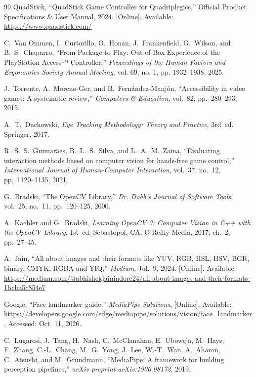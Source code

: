 \documentclass[twoside, a4paper, 11pt]{article}
\begin{document}
\begin{thebibliography}{99}
QuadStick, ``QuadStick Game Controller for Quadriplegics,'' Official Product Specifications \& User Manual, 2024. [Online]. Available: \url{https://www.quadstick.com/}

C.~Van Ommen, I.~Curtorillo, O.~Honan, J.~Frankenfield, G.~Wilson, and B.~S.~Chaparro, ``From Package to Play: Out-of-Box Experience of the PlayStation Access™ Controller,'' \emph{Proceedings of the Human Factors and Ergonomics Society Annual Meeting}, vol. 69, no. 1, pp. 1932--1938, 2025.

J.~Torrente, A.~Moreno-Ger, and B.~Fern\'andez-Manj\'on, ``Accessibility in video games: A systematic review,'' \emph{Computers \& Education}, vol.~82, pp.~280--293, 2015.

A.~T.~Duchowski, \emph{Eye Tracking Methodology: Theory and Practice}, 3rd~ed. Springer, 2017.

R.~S.~S.~Guimar\~aes, B.~L.~S.~Silva, and L.~A.~M.~Zaina, ``Evaluating interaction methods based on computer vision for hands-free game control,'' \emph{International Journal of Human-Computer Interaction}, vol.~37, no.~12, pp.~1120--1135, 2021.

G.~Bradski, ``The OpenCV Library,'' \emph{Dr. Dobb's Journal of Software Tools}, vol.~25, no.~11, pp.~120--125, 2000.

A.~Kaehler and G.~Bradski, \emph{Learning OpenCV 3: Computer Vision in C++ with the OpenCV Library}, 1st~ed. Sebastopol, CA: O'Reilly Media, 2017, ch.~2, pp.~27--45.

A.~Jain, ``All about images and their formats like YUV, RGB, HSL, HSV, BGR, binary, CMYK, RGBA and YIQ,'' \emph{Medium}, Jul.~9, 2024. [Online]. Available: \url{https://medium.com/@abhishekjainindore24/all-about-images-and-their-formats-1bcba5c854e7}

Google, ``Face landmarker guide,'' \emph{MediaPipe Solutions}, [Online]. Available: \url{https://developers.google.com/edge/mediapipe/solutions/vision/face_landmarker}, Accessed: Oct. 11, 2026.

C.~Lugaresi, J.~Tang, H.~Nash, C.~McClanahan, E.~Uboweja, M.~Hays, F.~Zhang, C.-L.~Chang, M.~G.~Yong, J.~Lee, W.-T.~Wan, A.~Aharon, C.~Atsushi, and M.~Grundmann, ``MediaPipe: A framework for building perception pipelines,'' \emph{arXiv preprint arXiv:1906.08172}, 2019.


\end{thebibliography}
\end{document}
